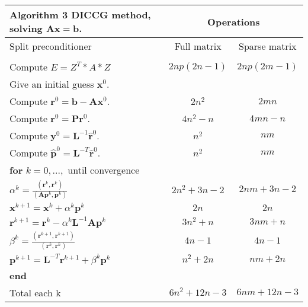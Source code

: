 \documentclass[a4paper,10pt]{report}
\begin{document}
 \begin{table}[!h]
\begin{tabular}{ |l|c|c| } 
\hline
  \textbf{Algorithm 3} DICCG method, solving $\mathbf{A}\mathbf{x}=\mathbf{b}$.& \multicolumn{2}{|c|}{Operations}\\
  \hline
Split preconditioner &Full matrix&Sparse matrix\\
 \hline
&&\\
Compute $E=Z^T*A*Z$&$2np(2n-1)$ &$2np(2m-1)$\\

\hline
Give an initial guess $\mathbf{x}^0$. &&\\
Compute $\mathbf{r}^0=\mathbf{b}-\mathbf{A}\mathbf{x}^0$.&$2n^2$&$2mn$\\
Compute $\mathbf{r}^0=\mathbf{P}\mathbf{r}^0$.&$4n^2-n$&$4mn-n$\\
Compute $\mathbf{y}^0=\mathbf{L}^{-1}\hat{\mathbf{r}}^0$.&$n^2$&$nm$\\
Compute $\hat{\mathbf{p}}^0=\mathbf{L}^{-T}\hat{\mathbf{r}}^0$.&$n^2$&$nm$\\
\hline
\hspace{0.5cm}\textbf{for} $k=0,...,$ until convergence&&\\
 \hspace{1cm} $\alpha^k=\frac{(\mathbf{r}^{k},\mathbf{r}^{k})}{(\mathbf{A}\mathbf{p}^k,\mathbf{p}^k)}$&$2n^2+3n-2$&$2nm+3n-2$\\
\hspace{1cm} $\mathbf{x}^{k+1}=\mathbf{x}^k+\alpha^k\mathbf{p}^k$&$2n$&$2n$\\
\hspace{1cm}$\mathbf{r}^{k+1}=\mathbf{r}^k-\alpha^k\mathbf{L}^{-1}\mathbf{A}\mathbf{p}^k$&$3n^2+n$&$3nm+n$\\
\hspace{1cm}$ \beta^k=\frac{(\mathbf{r}^{k+1},\mathbf{r}^{k+1})}{(\mathbf{r}^k,\mathbf{r}^k)}$&$4n-1$&$4n-1$\\
\hspace{1cm}$\mathbf{p}^{k+1}=\mathbf{L}^{-T}\mathbf{r}^{k+1}+\beta^k\mathbf{p}^k$&$n^2+2n$&$nm+2n$\\
\hspace{0.5cm}\textbf{end}&&\\
\hline
Total each k&$6n^2+12n-3$&$6nm+12n-3$\\
\hline
\end{tabular}
\end{table}
\end{document}
